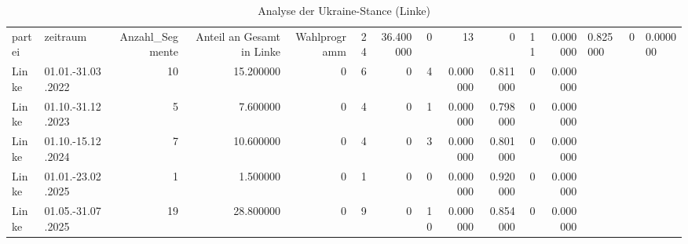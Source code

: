 \begin{table}
\caption{Analyse der Ukraine-Stance (Linke)}
\label{tab:meine_tabelle}
\begin{tabular}{llrrrrrrrrrr}
\toprule
partei & zeitraum & Anzahl_Segmente & Anteil an Gesamt in %
\midrule
Linke & Wahlprogramm & 24 & 36.400000 & 0 & 13 & 0 & 11 & 0.000000 & 0.825000 & 0 & 0.000000 \\
Linke & 01.01.-31.03.2022 & 10 & 15.200000 & 0 & 6 & 0 & 4 & 0.000000 & 0.811000 & 0 & 0.000000 \\
Linke & 01.10.-31.12.2023 & 5 & 7.600000 & 0 & 4 & 0 & 1 & 0.000000 & 0.798000 & 0 & 0.000000 \\
Linke & 01.10.-15.12.2024 & 7 & 10.600000 & 0 & 4 & 0 & 3 & 0.000000 & 0.801000 & 0 & 0.000000 \\
Linke & 01.01.-23.02.2025 & 1 & 1.500000 & 0 & 1 & 0 & 0 & 0.000000 & 0.920000 & 0 & 0.000000 \\
Linke & 01.05.-31.07.2025 & 19 & 28.800000 & 0 & 9 & 0 & 10 & 0.000000 & 0.854000 & 0 & 0.000000 \\
\bottomrule
\end{tabular}
\end{table}
